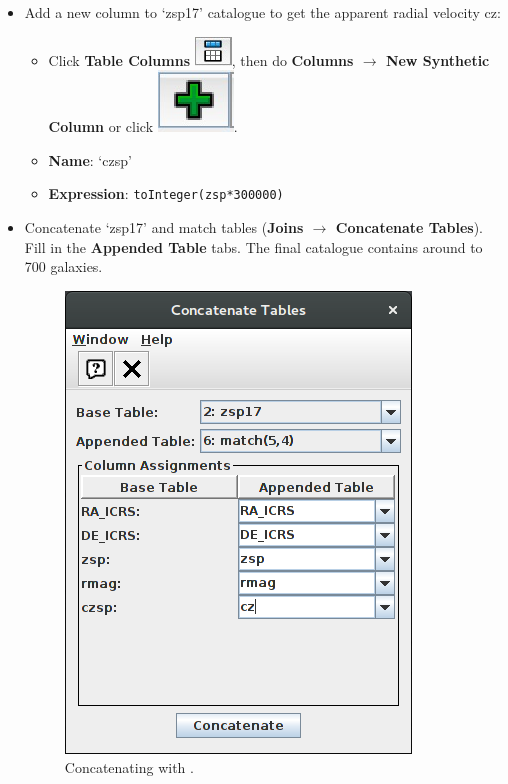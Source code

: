 \documentclass [a4paper, 12pt]{article}
\begin{document}
\begin{itemize}
\item Add a new column to `zsp17' catalogue to get the apparent radial velocity
cz:
\begin{itemize}
    \item Click \textbf{Table Columns}  \includegraphics[width=0.04
    \textwidth]{../images/topcat_button_metadata.jpg}, then do \textbf{Columns
        $\rightarrow$ New Synthetic Column} or click
        \includegraphics[width=0.04
    \textwidth]{../images/topcat_button_add.jpg}.
    \item \textbf{Name}: `czsp'
    \item \textbf{Expression}: \texttt{toInteger(zsp*300000)}
\end{itemize}
\item Concatenate `zsp17' and match tables (\textbf{Joins $\rightarrow$
Concatenate Tables}). Fill in the \textbf{Appended Table} tabs. The final
catalogue contains around to 700 galaxies.
\begin{figure}[H]
\center
\includegraphics[width=0.3
\textwidth]{../images/topcat_concatenate_SDSS_Rines2003.png}
\caption{Concatenating with \topcat.}
\label{fig:topcatconcat}
\end{figure}
\end{itemize}
\end{document}
